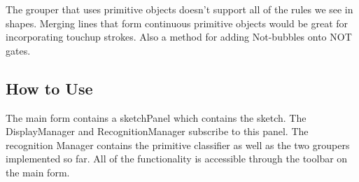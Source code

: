 \documentclass{article}
\begin{document}
The grouper that uses primitive objects doesn't support all of the rules we see in shapes. Merging lines that form continuous primitive objects would be great for incorporating touchup strokes. Also a method for adding Not-bubbles onto NOT gates.
\subsection{How to Use}
The main form contains a sketchPanel which contains the sketch. The DisplayManager and RecognitionManager subscribe to this panel. The recognition Manager contains the primitive classifier as well as the two groupers implemented so far. All of the functionality is accessible through the toolbar on the main form.
\end{document}
